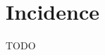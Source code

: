 \chapter{Incidence}
\label{chap:inc}

TODO

\begin{theorem}
    \label{ST_grid_final}
    \leanok
\end{theorem}